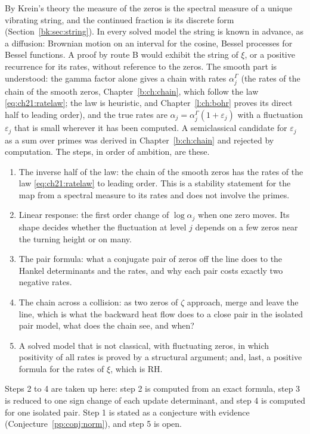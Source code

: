 By Krein's theory the measure of the zeros is the spectral measure of a unique vibrating string, and the continued fraction is its discrete form (Section~\ref{bk:sec:string}). In every solved model the string is known in advance, as a diffusion: Brownian motion on an interval for the cosine, Bessel processes for Bessel functions. A proof by route B would exhibit the string of $\xi$, or a positive recurrence for its rates, without reference to the zeros. The smooth part is understood: the gamma factor alone gives a chain with rates $\alpha^\Gamma_j$ (the rates of the chain of the smooth zeros, Chapter~\ref{b:ch:chain}, which follow the law \eqref{eq:ch21:ratelaw}; the law is heuristic, and Chapter~\ref{l:ch:bohr} proves its direct half to leading order), and the true rates are $\alpha_j=\alpha_j^\Gamma(1+\varepsilon_j)$ with a fluctuation $\varepsilon_j$ that is small wherever it has been computed. A semiclassical candidate for $\varepsilon_j$ as a sum over primes was derived in Chapter~\ref{b:ch:chain} and rejected by computation. The steps, in order of ambition, are these.
\begin{enumerate}
\item The inverse half of the law: the chain of the smooth zeros has the rates of the law \eqref{eq:ch21:ratelaw} to leading order. This is a stability statement for the map from a spectral measure to its rates and does not involve the primes.
\item Linear response: the first order change of $\log\alpha_j$ when one zero moves. Its shape decides whether the fluctuation at level $j$ depends on a few zeros near the turning height or on many.
\item The pair formula: what a conjugate pair of zeros off the line does to the Hankel determinants and the rates, and why each pair costs exactly two negative rates.
\item The chain across a collision: as two zeros of $\zeta$ approach, merge and leave the line, which is what the backward heat flow does to a close pair in the isolated pair model, what does the chain see, and when?
\item A solved model that is not classical, with fluctuating zeros, in which positivity of all rates is proved by a structural argument; and, last, a positive formula for the rates of $\xi$, which is RH.
\end{enumerate}
Steps 2 to 4 are taken up here: step 2 is computed from an exact formula, step 3 is reduced to one sign change of each update determinant, and step 4 is computed for one isolated pair. Step 1 is stated as a conjecture with evidence (Conjecture~\ref{pp:conj:norm}), and step 5 is open.

